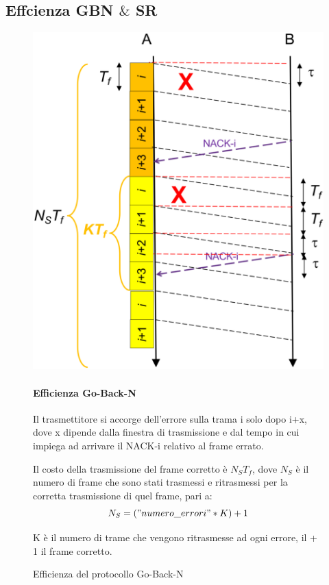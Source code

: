 \subsection{Effcienza GBN $\&$ SR}
\begin{figure}[htbp]
    \centering
    \begin{minipage}{0.4\textwidth}
        \includegraphics[width=\linewidth]{images/efficienzagbn.png}
        \caption{Efficienza del protocollo Go-Back-N}
    \end{minipage}%
    \hfill
    \begin{minipage}{0.5\textwidth}
        \paragraph{Efficienza Go-Back-N}
        Il trasmettitore si accorge dell'errore sulla trama i solo dopo i+x, dove x dipende dalla finestra di trasmissione e dal tempo in cui impiega ad arrivare il NACK-i relativo al frame errato.

        Il costo della trasmissione del frame corretto è $N_ST_f$, dove $N_S$ è il numero di frame che sono stati trasmessi e ritrasmessi per la corretta trasmissione di quel frame, pari a:
        \begin{equation}
        N_S = ("numero\_errori" * K) + 1
        \end{equation}

        K è il numero di trame che vengono ritrasmesse ad ogni errore, il + 1 il frame corretto.

    \end{minipage}
\end{figure}

